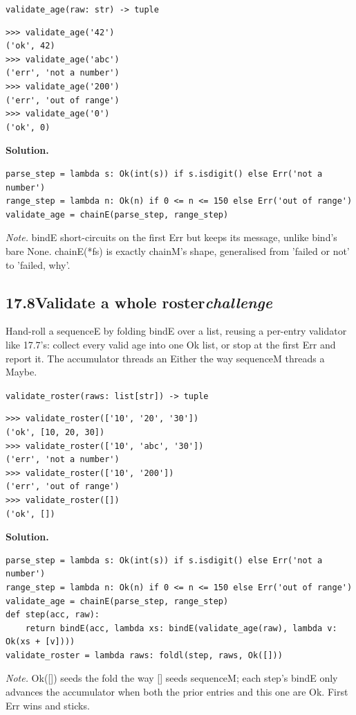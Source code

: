 \documentclass[10pt,letterpaper]{book}
\begin{document}
\noindent\texttt{validate\_age(raw: str) -> tuple}
\begin{lstlisting}[style=ex]
>>> validate_age('42')
('ok', 42)
>>> validate_age('abc')
('err', 'not a number')
>>> validate_age('200')
('err', 'out of range')
>>> validate_age('0')
('ok', 0)
\end{lstlisting}
\noindent\textbf{Solution.}
\begin{lstlisting}[style=code]
parse_step = lambda s: Ok(int(s)) if s.isdigit() else Err('not a number')
range_step = lambda n: Ok(n) if 0 <= n <= 150 else Err('out of range')
validate_age = chainE(parse_step, range_step)
\end{lstlisting}
\noindent\textit{Note.} bindE short-circuits on the first Err but keeps its message, unlike bind's bare None. chainE(*fs) is exactly chainM's shape, generalised from 'failed or not' to 'failed, why'.

\subsection*{17.8\quad Validate a whole roster\hfill\textnormal{\textit{challenge}}}
Hand-roll a sequenceE by folding bindE over a list, reusing a per-entry validator like 17.7's: collect every valid age into one Ok list, or stop at the first Err and report it. The accumulator threads an Either the way sequenceM threads a Maybe.

\noindent\texttt{validate\_roster(raws: list[str]) -> tuple}
\begin{lstlisting}[style=ex]
>>> validate_roster(['10', '20', '30'])
('ok', [10, 20, 30])
>>> validate_roster(['10', 'abc', '30'])
('err', 'not a number')
>>> validate_roster(['10', '200'])
('err', 'out of range')
>>> validate_roster([])
('ok', [])
\end{lstlisting}
\noindent\textbf{Solution.}
\begin{lstlisting}[style=code]
parse_step = lambda s: Ok(int(s)) if s.isdigit() else Err('not a number')
range_step = lambda n: Ok(n) if 0 <= n <= 150 else Err('out of range')
validate_age = chainE(parse_step, range_step)
def step(acc, raw):
    return bindE(acc, lambda xs: bindE(validate_age(raw), lambda v: Ok(xs + [v])))
validate_roster = lambda raws: foldl(step, raws, Ok([]))
\end{lstlisting}
\noindent\textit{Note.} Ok([]) seeds the fold the way [] seeds sequenceM; each step's bindE only advances the accumulator when both the prior entries and this one are Ok. First Err wins and sticks.
\end{document}
